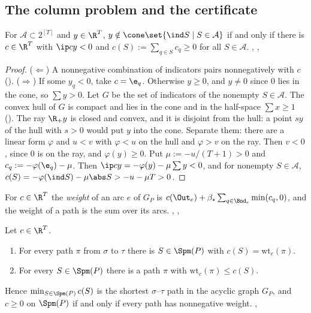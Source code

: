 \subsection{The column problem and the certificate}

\begin{lemma}\label{lem:farkas-cone}
For $\mathcal A\subset2^{[T]}$ and $y\in\R^T$, $y\notin\cone\set{\ind S\mid S\in\mathcal A}$ if and only if there is $c\in\R^T$ with $\ip cy<0$ and $c(S):=\sum_{q\in S}c_q\ge0$ for all $S\in\mathcal A$. \hfill{}, , 
\end{lemma}

\begin{proof}
($\Leftarrow$) A nonnegative combination of indicators pairs nonnegatively with $c$ (). ($\Rightarrow$) If some $y_q<0$, take $c=\e_q$. Otherwise $y\ge0$, and $y\ne0$ since $0$ lies in the cone, so $\sum y>0$. Let $G$ be the set of indicators of the nonempty $S\in\mathcal A$. The convex hull of $G$ is compact and lies in the cone and in the half-space $\sum x\ge1$ (). The ray $\R_+y$ is closed and convex, and it is disjoint from the hull: a point $sy$ of the hull with $s>0$ would put $y$ into the cone. Separate them: there are a linear form $\varphi$ and $u<v$ with $\varphi<u$ on the hull and $\varphi>v$ on the ray. Then $v<0$, since $0$ is on the ray, and $\varphi(y)\ge0$. Put $\mu:=-u/(T+1)>0$ and $c_q:=-\varphi(\e_q)-\mu$. Then $\ip cy=-\varphi(y)-\mu\sum y<0$, and for nonempty $S\in\mathcal A$, $c(S)=-\varphi(\ind S)-\mu\abs S>-u-\mu T>0$.
\end{proof}

For $c\in\R^T$ the \emph{weight} of an arc $e$ of $G_P$ is $c(\Out_e)+\beta_\star\sum_{q\in\Bnd_e}\min(c_q,0)$, and the weight of a path is the sum over its arcs. \hfill{}, , 

\begin{corollary}\label{cor:col}
Let $c\in\R^T$.
\begin{enumerate}[label=\textup{(\alph*)}]
\item For every path $\pi$ from $\sigma$ to $\tau$ there is $S\in\Spm(P)$ with $c(S)=\mathrm{wt}_c(\pi)$.
\item For every $S\in\Spm(P)$ there is a path $\pi$ with $\mathrm{wt}_c(\pi)\le c(S)$.
\end{enumerate}
Hence $\min_{S\in\Spm(P)}c(S)$ is the shortest $\sigma$--$\tau$ path in the acyclic graph $G_P$, and $c\ge0$ on $\Spm(P)$ if and only if every path has nonnegative weight. \hfill{}, 
\end{corollary}

